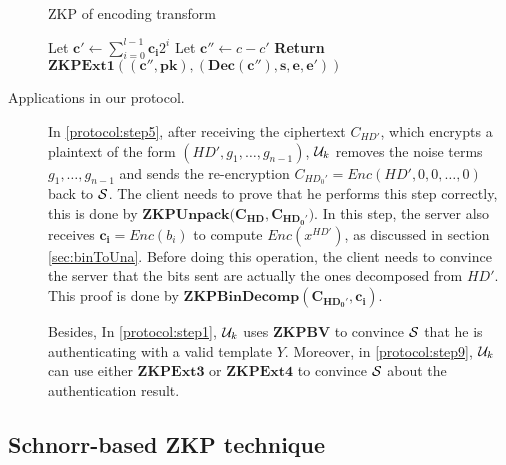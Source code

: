 \begin{description}
  \begin{algorithm}
    \caption{ZKP of encoding transform}\label{alg:ZKPBinDecomp}
    \begin{algorithmic}[1]
      \State Let $\mathbf{c'} \gets \sum_{i=0}^{l-1}\mathbf{c_i}2^i$
      \State Let $\mathbf{c''} \gets c - c' $
      \State \textbf{Return} $\mathbf{ZKPExt1((c'',pk),(Dec(c''),s,e,e'))}$
      \EndProcedure
    \end{algorithmic}
  \end{algorithm}
\item [Applications in our protocol.] In \ref{protocol:step5}, after receiving
  the ciphertext $C_{HD'}$, which encrypts a plaintext
  of the form $(HD', g_1, \dots, g_{n-1})$, $\mathcal{U}_k$ removes the noise terms $g_1, \dots,
  g_{n-1}$ and sends the re-encryption $C_{HD_0'} = Enc(HD', 0, 0, \dots,
  0)$ back to $\mathcal{S}$. The client needs to prove that he performs this step correctly, this is done
  by $\mathbf{ZKPUnpack(C_{HD},C_{HD_0'}})$. In this step, the server also receives $\mathbf{c_i} = Enc(b_i)$ to compute $Enc(x^{HD'})$, as discussed in section \ref{sec:binToUna}. Before doing this operation, the client needs to convince the server
  that the bits sent are actually the ones decomposed from $HD'$. This proof is done
  by $\mathbf{ZKPBinDecomp(C_{HD_0'},c_i)}$.

  Besides, In \ref{protocol:step1}, $\mathcal{U}_k$ uses $\mathbf{ZKPBV}$ to convince $\mathcal{S}$ that he is
  authenticating with a valid template $Y$. Moreover, in \ref{protocol:step9}, $\mathcal{U}_k$ can use either $\mathbf{ZKPExt3}$ or $\mathbf{ZKPExt4}$ to
  convince $\mathcal{S}$ about the authentication result.
\end{description}

\subsection{Schnorr-based ZKP technique}
\label{sec:zero-knowledge-proof}

